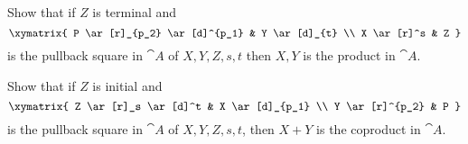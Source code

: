 \begin{exercise}
  Show that if $Z$ is terminal and
  \[ \xymatrix{
    P \ar[r]_{p_2} \ar[d]^{p_1} & Y \ar[d]_{t} \\
    X \ar[r]^s & Z
  } \]
  is the pullback square in $\cat{A}$ of $X, Y, Z, s, t$ then $X, Y$ is the product in $\cat{A}$.
\end{exercise}

\begin{exercise}
  Show that if $Z$ is initial and
  \[ \xymatrix{
    Z \ar[r]_s \ar[d]^t & X \ar[d]_{p_1} \\
    Y \ar[r]^{p_2} & P
  } \]
  is the pullback square in $\cat{A}$ of $X, Y, Z, s, t$, then $X + Y$ is the coproduct in $\cat{A}$.
\end{exercise}



